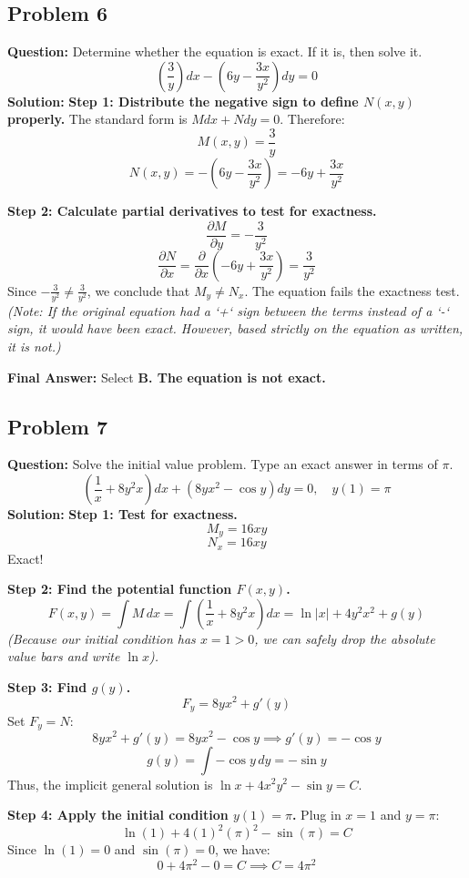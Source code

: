 \documentclass[11pt]{article}
\begin{document}
\vspace{0.5cm}
\subsection*{Problem 6}
\textbf{Question:} Determine whether the equation is exact. If it is, then solve it.
\[ \left( \frac{3}{y} \right) dx - \left( 6y - \frac{3x}{y^2} \right) dy = 0 \]
\textbf{Solution:} 
\textbf{Step 1: Distribute the negative sign to define $N(x,y)$ properly.}
The standard form is $M dx + N dy = 0$. Therefore:
\[ M(x, y) = \frac{3}{y} \]
\[ N(x, y) = -\left( 6y - \frac{3x}{y^2} \right) = -6y + \frac{3x}{y^2} \]

\textbf{Step 2: Calculate partial derivatives to test for exactness.}
\[ \frac{\partial M}{\partial y} = -\frac{3}{y^2} \]
\[ \frac{\partial N}{\partial x} = \frac{\partial}{\partial x}\left( -6y + \frac{3x}{y^2} \right) = \frac{3}{y^2} \]
Since $-\frac{3}{y^2} \neq \frac{3}{y^2}$, we conclude that $M_y \neq N_x$. The equation fails the exactness test.
\textit{(Note: If the original equation had a `+` sign between the terms instead of a `-` sign, it would have been exact. However, based strictly on the equation as written, it is not.)}

\textbf{Final Answer:} Select \textbf{B. The equation is not exact.}

\vspace{0.5cm}
\subsection*{Problem 7}
\textbf{Question:} Solve the initial value problem. Type an exact answer in terms of $\pi$.
\[ \left( \frac{1}{x} + 8y^2 x \right) dx + \left(8y x^2 - \cos y\right) dy = 0, \quad y(1) = \pi \]
\textbf{Solution:} 
\textbf{Step 1: Test for exactness.}
\[ M_y = 16xy \]
\[ N_x = 16xy \]
Exact!

\textbf{Step 2: Find the potential function $F(x,y)$.}
\[ F(x, y) = \int M \, dx = \int \left( \frac{1}{x} + 8y^2 x \right) dx = \ln|x| + 4y^2 x^2 + g(y) \]
\textit{(Because our initial condition has $x = 1 > 0$, we can safely drop the absolute value bars and write $\ln x$).}

\textbf{Step 3: Find $g(y)$.}
\[ F_y = 8y x^2 + g'(y) \]
Set $F_y = N$:
\[ 8y x^2 + g'(y) = 8y x^2 - \cos y \implies g'(y) = -\cos y \]
\[ g(y) = \int -\cos y \, dy = -\sin y \]
Thus, the implicit general solution is $\ln x + 4x^2 y^2 - \sin y = C$.

\textbf{Step 4: Apply the initial condition $y(1) = \pi$.}
Plug in $x = 1$ and $y = \pi$:
\[ \ln(1) + 4(1)^2 (\pi)^2 - \sin(\pi) = C \]
Since $\ln(1) = 0$ and $\sin(\pi) = 0$, we have:
\[ 0 + 4\pi^2 - 0 = C \implies C = 4\pi^2 \]
\end{document}
